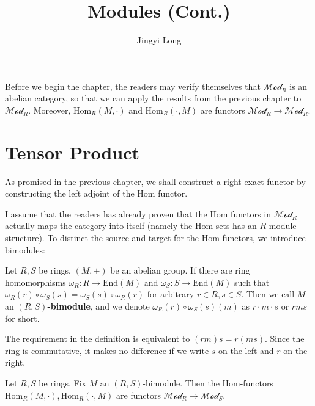 \documentclass{note-eng}
\title{Modules (Cont.)}
\author{Jingyi Long}
\begin{document}
\maketitle
\tableofcontents

Before we begin the chapter, the readers may verify themselves that $\mathscr{Mod}_{R}$ is an abelian category, so that we can apply the results from the previous chapter to $\mathscr{Mod}_R$. Moreover, $\mathrm{Hom}_{R}(M, \cdot)$ and $\mathrm{Hom}_{R}(\cdot, M)$ are functors $\mathscr{Mod}_R \rightarrow \mathscr{Mod}_R$.

\newpage

\section{Tensor Product}

As promised in the previous chapter, we shall construct a right exact functor by constructing the left adjoint of the $\mathrm{Hom}$ functor.

I assume that the readers has already proven that the Hom functors in $\mathscr{Mod}_R$ actually maps the category into itself (namely the Hom sets has an $R$-module structure). To distinct the source and target for the Hom functors, we introduce bimodules:

\begin{definition}[Bimodules]
    Let $R, S$ be rings, $(M, +)$ be an abelian group. If there are ring homomorphisms $\omega_R: R \rightarrow \mathrm{End}(M)$ and $\omega_S: S \rightarrow \mathrm{End}(M)$ such that $\omega_R(r) \circ \omega_S(s) = \omega_S(s) \circ \omega_R(r)$ for arbitrary $r \in R, s \in S$. Then we call $M$ an \textbf{$(R, S)$-bimodule}, and we denote $\omega_R(r) \circ \omega_S(s) (m)$ as $r \cdot m \cdot s$ or $rms$ for short.
\end{definition}

\begin{remark}
    The requirement in the definition is equivalent to $(rm)s = r(ms)$. Since the ring is commutative, it makes no difference if we write $s$ on the left and $r$ on the right.
\end{remark}

\begin{proposition}
    Let $R, S$ be rings. Fix $M$ an $(R, S)$-bimodule. Then the $\mathrm{Hom}$-functors $\mathrm{Hom}_{R}(M, \cdot), \mathrm{Hom}_{R}(\cdot, M)$ are functors $\mathscr{Mod}_R \rightarrow \mathscr{Mod}_S$.
\end{proposition}
\end{document}
